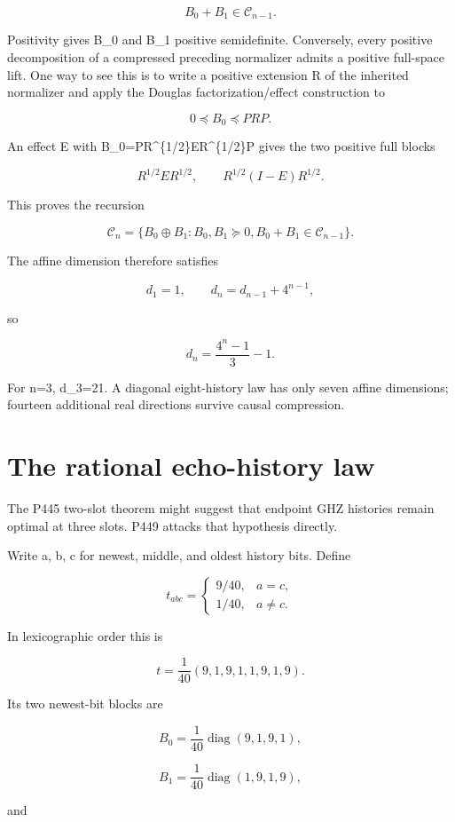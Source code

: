 \documentclass[11pt,a4paper,openany]{report}
\begin{document}
\[
B_0+B_1\in\mathcal C_{n-1}.
\]

Positivity gives B\_0 and B\_1 positive semidefinite. Conversely, every positive decomposition of a compressed preceding normalizer admits a positive full-space lift. One way to see this is to write a positive extension R of the inherited normalizer and apply the Douglas factorization/\allowbreak{}effect construction to

\[
0\preceq B_0\preceq PRP.
\]

An effect E with B\_0=PR\textasciicircum{}\{1/\allowbreak{}2\}ER\textasciicircum{}\{1/\allowbreak{}2\}P gives the two positive full blocks

\[
R^{1/2}ER^{1/2},
\qquad
R^{1/2}(I-E)R^{1/2}.
\]

This proves the recursion

\[
\mathcal C_n
=\{B_0\oplus B_1:B_0,B_1\succeq0,
B_0+B_1\in\mathcal C_{n-1}\}.
\]

The affine dimension therefore satisfies

\[
d_1=1,
\qquad
d_n=d_{n-1}+4^{n-1},
\]

so

\[
d_n=\frac{4^n-1}{3}-1.
\]

For n=3, d\_3=21. A diagonal eight-history law has only seven affine dimensions; fourteen additional real directions survive causal compression.

\section{The rational echo-history law}

The P445 two-slot theorem might suggest that endpoint GHZ histories remain optimal at three slots. P449 attacks that hypothesis directly.

Write a, b, c for newest, middle, and oldest history bits. Define

\[
t_{abc}
=\begin{cases}
9/40,&a=c,\\
1/40,&a\ne c.
\end{cases}
\]

In lexicographic order this is

\[
t=\frac1{40}(9,1,9,1,1,9,1,9).
\]

Its two newest-bit blocks are

\[
B_0=\frac1{40}\operatorname{diag}(9,1,9,1),
\]

\[
B_1=\frac1{40}\operatorname{diag}(1,9,1,9),
\]

and
\end{document}
